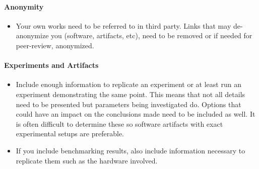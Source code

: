 \paragraph{Anonymity}
\begin{itemize}
  \item{} Your own works need to be referred to in third party. Links that may de-anonymize you
    (software, artifacts, etc), need to be removed or if needed for peer-review, anonymized.
\end{itemize}

\paragraph{Experiments and Artifacts}
\begin{itemize}
  \item{} Include enough information to replicate an experiment or at least run an experiment
    demonstrating the same point. This means that not all details need to be presented but
    parameters being investigated do. Options that could have an impact on the conclusions made
    need to be included as well. It is often difficult to determine these so software artifacts
    with exact experimental setups are preferable.
  \item{} If you include benchmarking results, also include information necessary to replicate them
    such as the hardware involved.
\end{itemize}
